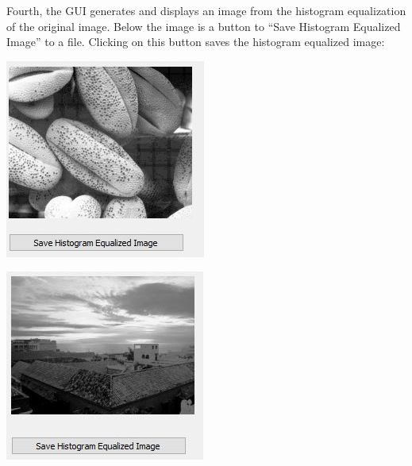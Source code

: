 \documentclass{article}
\newenvironment{Figure}
  {\par\medskip\noindent\ignorespaces\minipage{\linewidth}}
  {\endminipage\par\medskip}
\begin{document}
\begin{multicols*}{2}
Fourth, the GUI generates and displays an image from the histogram equalization of the original image. Below the image is a button to “Save Histogram Equalized Image” to a file. Clicking on this button saves the histogram equalized image:


\begin{Figure}
 \centering
 \includegraphics[width=\linewidth]{HistogramEqualizedImage.jpg}
\end{Figure}

\begin{Figure}
 \centering
 \includegraphics[width=\linewidth]{HistogramEqualizedImage2.jpg}
\end{Figure}


\end{multicols*}
\end{document}
